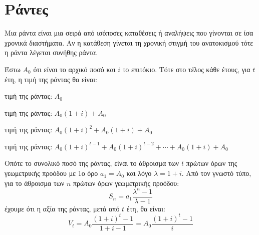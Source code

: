 \documentclass[a4paper,table]{report}
\begin{document}
\chapter*{Ράντες}

\begin{dfn}
  Μια \textcolor{Col1}{ράντα} είναι μια σειρά από ισόποσες καταθέσεις ή αναλήψεις που 
  γίνονται σε ίσα χρονικά διαστήματα. Αν η κατάθεση γίνεται τη χρονική στιγμή του 
  ανατοκισμού τότε η ράντα λέγεται \textcolor{Col1}{συνήθης ράντα}.
\end{dfn}
Έστω $ A_{0} $ ότι είναι το αρχικό ποσό και $i$ το επιτόκιο. Τότε στο τέλος κάθε έτους, 
για $ t $ έτη, η τιμή της ράντας θα είναι:
\begin{description}[widest=[3o Έτος,labelsep*=1ex,leftmargin=*]
  \item [1ο έτος:] τιμή της ράντας: $ A_{0} $
  \item [2ο έτος:] τιμή της ράντας: $ A_{0}(1+i) + A_{0} $
  \item [3ο έτος:] τιμή της ράντας: $ A_{0}(1+i)^{2} + A_{0}(1+i) + A_{0} $
  \item [$t$ έτος:] τιμή της ράντας: $ A_{0}(1+i)^{t-1} + A_{0}(1+i)^{t-2} + \cdots + 
    A_{0}(1+i) + A_{0} $
\end{description}
Οπότε το συνολικό ποσό της ράντας, είναι το άθροισμα των $t$ πρώτων όρων της 
γεωμετρικής προόδου με 1ο όρο $ a_{1}=A_{0} $ και λόγο $ \lambda = 1+i $. Από τον 
γνωστό τύπο, για το άθροισμα των $n$ πρώτων όρων γεωμετρικής προόδου:
\[
  S_{n} = a_{1} \frac{\lambda ^{n}-1}{\lambda -1} 
\] 
έχουμε ότι η αξία της ράντας, μετά από $t$ έτη,  θα είναι:
\[
  V_{t} = A_{0} \frac{(1+i)^{t}-1}{1+i-1} = A_{0} \frac{(1+i)^{t}-1}{i}
\] 
\end{document}
